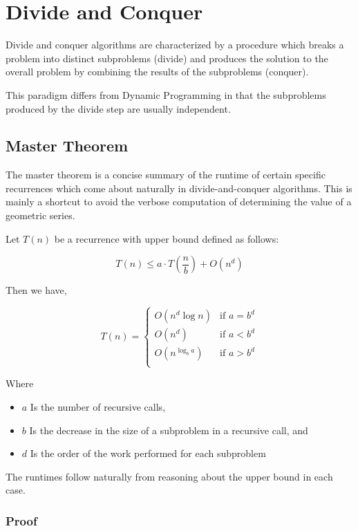\documentclass{standalone}
\begin{document}
\section{Divide and Conquer}

Divide and conquer algorithms are characterized by a procedure which breaks a
problem into distinct subproblems (divide) and produces the solution to the
overall problem by combining the results of the subproblems (conquer).

This paradigm differs from Dynamic Programming in that the subproblems produced
by the divide step are usually independent.

\subsection{Master Theorem}

The master theorem is a concise summary of the runtime of certain specific
recurrences which come about naturally in divide-and-conquer algorithms. This is
mainly a shortcut to avoid the verbose computation of determining the value of
a geometric series.

Let $T(n)$ be a recurrence with upper bound defined as follows:

\[
  T(n) \leqslant a \cdot T(\frac n b) + O(n^d)
\]

Then we have,

\[
  T(n) =
  \begin{cases}
    O(n^d \log n) & \text{if $a = b^d$} \\
    O(n^d) & \text{if $a < b^d$} \\
    O(n^{\log_b a}) & \text{if $a > b^d$} \\
  \end{cases}
\]

Where
\begin{itemize}
  \item $a$ Is the number of recursive calls,
  \item $b$ Is the decrease in the size of a subproblem in a recursive call, and
  \item $d$ Is the order of the work performed for each subproblem
\end{itemize}

The runtimes follow naturally from reasoning about the upper bound in each case.

\subsubsection{Proof}
\end{document}
